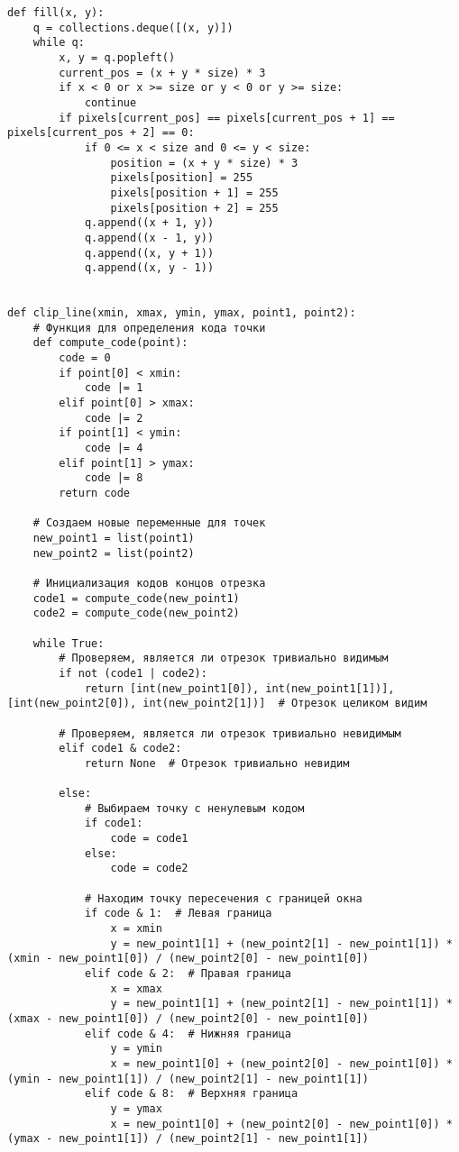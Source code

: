 \documentclass[a4paper, 14pt]{extarticle}
\begin{document}
\begin{lstlisting}
def fill(x, y):
    q = collections.deque([(x, y)])
    while q:
        x, y = q.popleft()
        current_pos = (x + y * size) * 3
        if x < 0 or x >= size or y < 0 or y >= size:
            continue
        if pixels[current_pos] == pixels[current_pos + 1] == pixels[current_pos + 2] == 0:
            if 0 <= x < size and 0 <= y < size:
                position = (x + y * size) * 3
                pixels[position] = 255
                pixels[position + 1] = 255
                pixels[position + 2] = 255
            q.append((x + 1, y))
            q.append((x - 1, y))
            q.append((x, y + 1))
            q.append((x, y - 1))


def clip_line(xmin, xmax, ymin, ymax, point1, point2):
    # Функция для определения кода точки
    def compute_code(point):
        code = 0
        if point[0] < xmin:
            code |= 1
        elif point[0] > xmax:
            code |= 2
        if point[1] < ymin:
            code |= 4
        elif point[1] > ymax:
            code |= 8
        return code

    # Создаем новые переменные для точек
    new_point1 = list(point1)
    new_point2 = list(point2)

    # Инициализация кодов концов отрезка
    code1 = compute_code(new_point1)
    code2 = compute_code(new_point2)

    while True:
        # Проверяем, является ли отрезок тривиально видимым
        if not (code1 | code2):
            return [int(new_point1[0]), int(new_point1[1])], [int(new_point2[0]), int(new_point2[1])]  # Отрезок целиком видим

        # Проверяем, является ли отрезок тривиально невидимым
        elif code1 & code2:
            return None  # Отрезок тривиально невидим

        else:
            # Выбираем точку с ненулевым кодом
            if code1:
                code = code1
            else:
                code = code2

            # Находим точку пересечения с границей окна
            if code & 1:  # Левая граница
                x = xmin
                y = new_point1[1] + (new_point2[1] - new_point1[1]) * (xmin - new_point1[0]) / (new_point2[0] - new_point1[0])
            elif code & 2:  # Правая граница
                x = xmax
                y = new_point1[1] + (new_point2[1] - new_point1[1]) * (xmax - new_point1[0]) / (new_point2[0] - new_point1[0])
            elif code & 4:  # Нижняя граница
                y = ymin
                x = new_point1[0] + (new_point2[0] - new_point1[0]) * (ymin - new_point1[1]) / (new_point2[1] - new_point1[1])
            elif code & 8:  # Верхняя граница
                y = ymax
                x = new_point1[0] + (new_point2[0] - new_point1[0]) * (ymax - new_point1[1]) / (new_point2[1] - new_point1[1])


\end{lstlisting}
\end{document}
